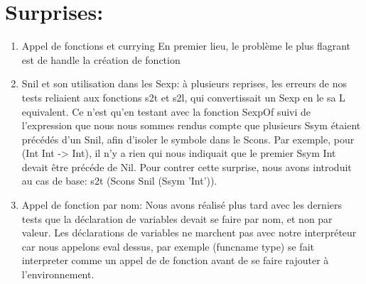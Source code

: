 \documentclass{article}
\begin{document}
\section*{Surprises:}
\begin{enumerate}
    \item Appel de fonctions et currying
    En premier lieu, le problème le plus flagrant est de handle la création de fonction

    \item Snil et son utilisation dans les Sexp:
    à plusieurs reprises, les erreurs de nos tests reliaient aux fonctions s2t et s2l, qui convertissait un Sexp en le sa L equivalent. Ce n'est qu'en testant avec la fonction SexpOf suivi de l'expression que nous nous sommes rendus compte que plusieurs Ssym étaient précédés d'un Snil, afin d'isoler le symbole dans le Scons. Par exemple, pour (Int Int -> Int), il n'y a rien qui nous indiquait que le premier Ssym Int devait être précéde de Nil. Pour contrer cette surprise, nous avons introduit au cas de base: s2t (Scons Snil (Ssym 'Int')). 

    \item Appel de fonction par nom:
    Nous avons réalisé plus tard avec les derniers tests que la déclaration de variables devait se faire par nom, et non par valeur. Les déclarations de variables ne marchent pas avec notre interpréteur car nous appelons eval dessus, par exemple (funcname type) se fait interpreter comme un appel de de fonction avant de se faire rajouter à l'environnement. 

    
\end{enumerate}
\end{document}
